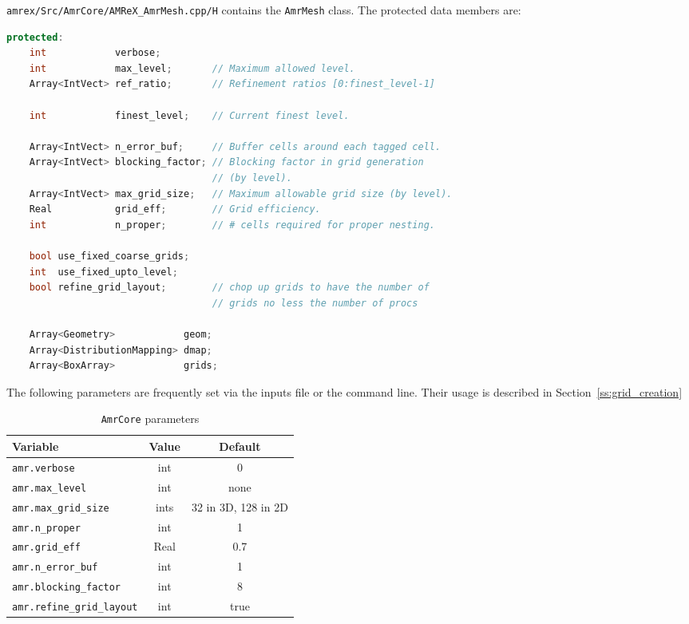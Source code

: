 {\tt amrex/Src/AmrCore/AMReX\_AmrMesh.cpp/H} contains the {\tt AmrMesh} class.
The protected data members are:
\begin{lstlisting}[language=cpp]
protected:
    int            verbose;
    int            max_level;       // Maximum allowed level.
    Array<IntVect> ref_ratio;       // Refinement ratios [0:finest_level-1]

    int            finest_level;    // Current finest level.

    Array<IntVect> n_error_buf;     // Buffer cells around each tagged cell.
    Array<IntVect> blocking_factor; // Blocking factor in grid generation 
                                    // (by level).
    Array<IntVect> max_grid_size;   // Maximum allowable grid size (by level).
    Real           grid_eff;        // Grid efficiency.
    int            n_proper;        // # cells required for proper nesting.

    bool use_fixed_coarse_grids;
    int  use_fixed_upto_level;
    bool refine_grid_layout;        // chop up grids to have the number of 
                                    // grids no less the number of procs

    Array<Geometry>            geom;
    Array<DistributionMapping> dmap;
    Array<BoxArray>            grids;    
\end{lstlisting}

The following parameters are frequently set via the inputs file or the command line.  
Their usage is described in Section~\ref{ss:grid_creation}

\begin{table}[h]
  \centering
  \begin{tabular}{lcc}
    Variable & Value & Default \\
    \hline
    {\tt amr.verbose}              & int  & 0    \\
    {\tt amr.max\_level}           & int  & none \\
    {\tt amr.max\_grid\_size}      & ints & 32 in 3D, 128 in 2D \\
    {\tt amr.n\_proper}            & int  & 1    \\
    {\tt amr.grid\_eff}            & Real & 0.7  \\
    {\tt amr.n\_error\_buf}        & int  & 1    \\
    {\tt amr.blocking\_factor}     &int   & 8    \\
    {\tt amr.refine\_grid\_layout} &int   & true \\
    \hline
  \end{tabular}
  \caption{\label{tab:makevarimp} {\tt AmrCore} parameters}
\end{table}


